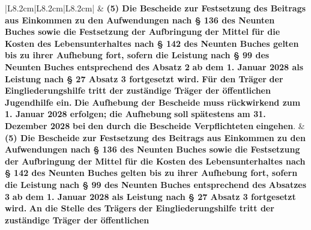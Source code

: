 \documentclass[10pt,a4paper,landscape]{article}
\begin{document}
\begin{longtable}{|L{8.2cm}|L{8.2cm}|L{8.2cm}|}
\hhline{|---|}
 & \textbf{(5) Die Bescheide zur Festsetzung des  \newline Beitrags aus Einkommen zu den  \newline Aufwendungen nach \S{} 136 des Neunten  \newline Buches sowie die Festsetzung der  \newline Aufbringung der Mittel für die Kosten  \newline des Lebensunterhaltes nach \S{} 142 des  \newline Neunten Buches gelten bis zu ihrer  \newline Aufhebung fort, sofern die Leistung  \newline nach \S{} 99 des Neunten Buches  \newline entsprechend des }\textbf{\textcolor{diffred}{Absatz 2}}\textbf{ ab dem 1.  \newline Januar 2028 als Leistung nach \S{} 27  \newline Absatz 3 fortgesetzt wird. }\textbf{\textcolor{diffred}{Für den  \newline Träger}}\textbf{ der Eingliederungshilfe tritt der  \newline zuständige Träger der öffentlichen} \newline \textbf{\textcolor{diffred}{Jugendhilfe ein.}}\textbf{ Die Aufhebung der  \newline Bescheide muss rückwirkend zum 1.  \newline Januar 2028 erfolgen; die Aufhebung} \newline \textbf{\textcolor{diffred}{soll}}\textbf{ spätestens am 31. Dezember 2028} \newline \textbf{\textcolor{diffred}{bei}}\textbf{ den durch die Bescheide  \newline Verpflichteten }\textbf{\textcolor{diffred}{eingehen}}\textcolor{diffred}{.} & \textbf{(5) Die Bescheide zur Festsetzung des  \newline Beitrags aus Einkommen zu den } \textbf{Aufwendungen nach \S{} 136 des Neunten  \newline Buches sowie die Festsetzung der  \newline Aufbringung der Mittel für die Kosten  \newline des Lebensunterhaltes nach \S{} 142 des  \newline Neunten Buches gelten bis zu ihrer  \newline Aufhebung fort, sofern die Leistung  \newline nach \S{} 99 des Neunten Buches  \newline entsprechend des }\textbf{\textcolor{diffgreen}{Absatzes 3}}\textbf{ ab dem 1.  \newline Januar 2028 als Leistung nach \S{} 27  \newline Absatz 3 fortgesetzt wird. }\textbf{\textcolor{diffgreen}{An die Stelle  \newline des Trägers}}\textbf{ der Eingliederungshilfe tritt  \newline der zuständige Träger der öffentlichen} \newline 
\end{longtable}
\end{document}
